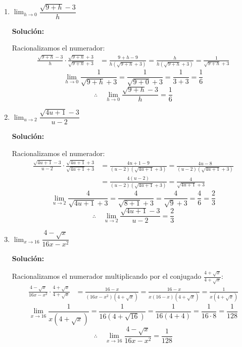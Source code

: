 \documentclass[12pt]{article}
\newcommand{\solucion}{%
    \vspace{0.8em}%
    \textbf{Solución:}%
}
\begin{document}
\begin{enumerate}[label=\alph*)]
    \item $\lim_{h \to 0} \dfrac{\sqrt{9 + h} - 3}{h}$

    \solucion

    Racionalizamos el numerador:
    \begin{align*}
        \frac{\sqrt{9+h}-3}{h} \cdot \frac{\sqrt{9+h}+3}{\sqrt{9+h}+3}
        &= \frac{9+h-9}{h(\sqrt{9+h}+3)}
        = \frac{h}{h(\sqrt{9+h}+3)}
        = \frac{1}{\sqrt{9+h}+3}
    \end{align*}
    \[
        \lim_{h\to0}\frac{1}{\sqrt{9+h}+3} = \frac{1}{\sqrt{9+0}+3} = \frac{1}{3+3} = \frac{1}{6}
    \]
    \[
        \therefore\quad \lim_{h\to0}\frac{\sqrt{9+h}-3}{h} = \frac{1}{6}
    \]

    \item $\lim_{u \to 2} \dfrac{\sqrt{4u+1}-3}{u-2}$

    \solucion

    Racionalizamos el numerador:
    \begin{align*}
        \frac{\sqrt{4u+1}-3}{u-2} \cdot \frac{\sqrt{4u+1}+3}{\sqrt{4u+1}+3}
        &= \frac{4u+1-9}{(u-2)(\sqrt{4u+1}+3)}
        = \frac{4u-8}{(u-2)(\sqrt{4u+1}+3)} \\
        &= \frac{4(u-2)}{(u-2)(\sqrt{4u+1}+3)}
        = \frac{4}{\sqrt{4u+1}+3}
    \end{align*}
    \[
        \lim_{u\to2}\frac{4}{\sqrt{4u+1}+3} = \frac{4}{\sqrt{8+1}+3} = \frac{4}{\sqrt{9}+3} = \frac{4}{6} = \frac{2}{3}
    \]
    \[
        \therefore\quad \lim_{u\to2}\frac{\sqrt{4u+1}-3}{u-2} = \frac{2}{3}
    \]

    \item $\lim_{x \to 16} \dfrac{4 - \sqrt{x}}{16x - x^2}$

    \solucion

    Racionalizamos el numerador multiplicando por el conjugado $\frac{4+\sqrt{x}}{4+\sqrt{x}}$:
    \begin{align*}
        \frac{4-\sqrt{x}}{16x-x^2} \cdot \frac{4+\sqrt{x}}{4+\sqrt{x}}
        &= \frac{16-x}{(16x-x^2)(4+\sqrt{x})}
        = \frac{16-x}{x(16-x)(4+\sqrt{x})}
        = \frac{1}{x(4+\sqrt{x})}
    \end{align*}
    \[
        \lim_{x\to16}\frac{1}{x(4+\sqrt{x})} = \frac{1}{16(4+\sqrt{16})} = \frac{1}{16(4+4)} = \frac{1}{16 \cdot 8} = \frac{1}{128}
    \]
    \[
        \therefore\quad \lim_{x\to16}\frac{4-\sqrt{x}}{16x-x^2} = \frac{1}{128}
    \]


\end{enumerate}
\end{document}
